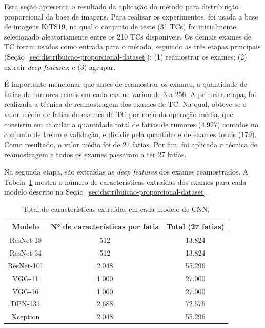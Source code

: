Esta seção apresenta o resultado da aplicação do método para distribuição proporcional da base de imagens. Para realizar os experimentos, foi usada a base de imagens KiTS19, na qual o conjunto de teste (31 TCs) foi inicialmente selecionado aleatoriamente entre os 210 TCs disponíveis. Os demais exames de TC foram usados como entrada para o método, seguindo as três etapas principais (Seção~\ref{sec:distribuicao-proporcional-dataset}): (1) reamostrar os exames; (2) extrair \textit{deep features}; e (3) agrupar.

É importante mencionar que antes de reamostrar os exames, a quantidade de fatias de tumores renais em cada exame variou de 3 a 256. A primeira etapa, foi realizada a técnica de reamostragem dos exames de TC. Na qual, obteve-se o valor médio de fatias de exames de TC por meio da operação média, que consistiu em calcular a quantidade total de fatias de tumores (4.927) contidos no conjunto de treino e validação, e dividir pela quantidade de exames totais (179). Como resultado, o valor médio foi de 27 fatias. Por fim, foi aplicada a técnica de reamostragem e todos os exames passaram a ter 27 fatias.

Na segunda etapa, são extraídas as \textit{deep features} dos exames reamostrados. A Tabela~\ref{tab:numero-caracteristicas} mostra o número de características extraídas dos exames para cada modelo descrito na Seção~\ref{sec:distribuicao-proporcional-dataset}.

\begin{table}[!ht]
\caption{Total de características extraídas em cada modelo de CNN.}
\label{tab:numero-caracteristicas}
\centering
\begin{tabular}{c|c|c}
\hline
Modelo     & N° de características por fatia & Total (27 fatias) \\ \hline
ResNet-18  & 512                             & 13.824             \\ \hline
ResNet-34  & 512                             & 13.824             \\ \hline
ResNet-101 & 2.048                            & 55.296             \\ \hline
VGG-11     & 1.000                            & 27.000             \\ \hline
VGG-16     & 1.000                            & 27.000             \\ \hline
DPN-131    & 2.688                            & 72.576             \\ \hline
Xception   & 2.048                            & 55.296             \\ \hline
\end{tabular}
\end{table}

